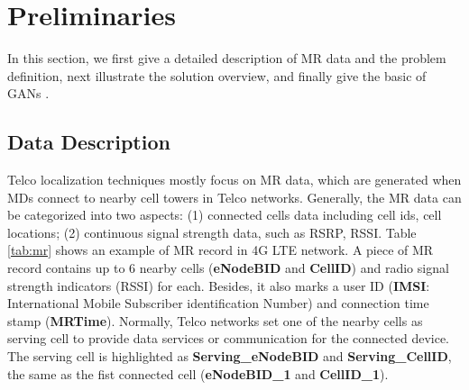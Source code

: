 \section{Preliminaries}
In this section, we first give a detailed description of MR data and the problem definition, next illustrate the solution overview, and finally give the basic of GANs \cite{DBLP:conf/nips/GoodfellowPMXWOCB14}.

\subsection{Data Description}
Telco localization techniques mostly focus on MR data, which are generated when MDs connect to nearby cell towers in Telco networks. Generally, the MR data can be categorized into two aspects: (1) connected cells data including cell ids, cell locations; (2) continuous signal strength data, such as RSRP, RSSI. Table \ref{tab:mr} shows an example of MR record in 4G LTE network. A piece of MR record contains up to 6 nearby cells (\textbf{eNodeBID} and \textbf{CellID}) and radio signal strength indicators (RSSI) for each. Besides, it also marks a user ID (\textbf{IMSI}: International Mobile Subscriber identification Number) and connection time stamp (\textbf{MRTime}). Normally, Telco networks set one of the nearby cells as serving cell to provide data services or communication for the connected device. The serving cell is highlighted as \textbf{Serving\_eNodeBID} and \textbf{Serving\_CellID}, the same as the fist connected cell (\textbf{eNodeBID\_1} and \textbf{CellID\_1}).


